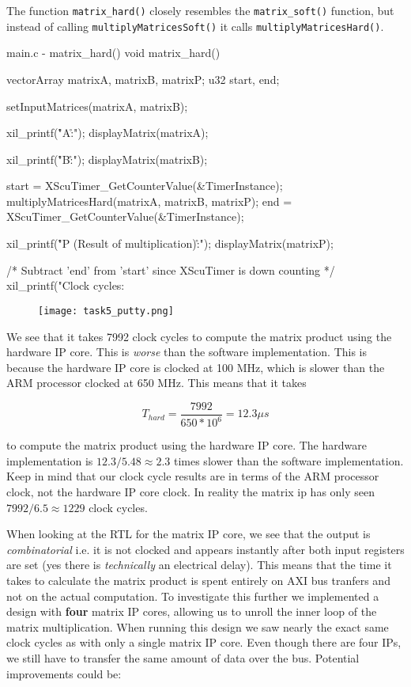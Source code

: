 \documentclass[../main.tex]{subfiles}
\begin{document}
\newpage

The function \texttt{matrix\_hard()} closely resembles the \texttt{matrix\_soft()} function, but instead of calling \texttt{multiplyMatricesSoft()} it calls \texttt{multiplyMatricesHard()}.

\begin{myminted}{main.c - matrix\_hard()}
void matrix_hard()
{
	vectorArray matrixA, matrixB, matrixP;
	u32 start, end;

	setInputMatrices(matrixA, matrixB);

	xil_printf("\r\n\nMatrix A:\r\n");
	displayMatrix(matrixA);

	xil_printf("\r\n\nMatrix B:\r\n");
	displayMatrix(matrixB);

	start = XScuTimer_GetCounterValue(&TimerInstance);
	multiplyMatricesHard(matrixA, matrixB, matrixP);
	end = XScuTimer_GetCounterValue(&TimerInstance);

	xil_printf("\r\n\nMatrix P (Result of multiplication):\r\n");
	displayMatrix(matrixP);

	/* Subtract 'end' from 'start' since XScuTimer is down counting */
	xil_printf("Clock cycles: %
}
\end{myminted}

\begin{figure}[h]
    \centering
    \texttt{[image: task5\_putty.png]}
\end{figure}

\newpage

We see that it takes 7992 clock cycles to compute the matrix product using the hardware IP core. This is \textit{worse} than the software implementation. This is because the hardware IP core is clocked at 100 MHz, which is slower than the ARM processor clocked at 650 MHz. This means that it takes

$$ T_{hard} = \frac{7992}{650 * 10^6} = 12.3 \mu s $$

to compute the matrix product using the hardware IP core. The hardware implementation is $12.3/5.48 \approx 2.3$ times slower than the software implementation. Keep in mind that our clock cycle results are in terms of the ARM processor clock, not the hardware IP core clock. In reality the matrix ip has only seen $7992/6.5 \approx 1229$ clock cycles.

\vspace{10pt}

When looking at the RTL for the matrix IP core, we see that the output is \textit{combinatorial} i.e. it is not clocked and appears instantly after both input registers are set (yes there is \textit{technically} an electrical delay). This means that the time it takes to calculate the matrix product is spent entirely on AXI bus tranfers and not on the actual computation. To investigate this further we implemented a design with \textbf{four} matrix IP cores, allowing us to unroll the inner loop of the matrix multiplication. When running this design we saw nearly the exact same clock cycles as with only a single matrix IP core. Even though there are four IPs, we still have to transfer the same amount of data over the bus. Potential improvements could be:
\end{document}
